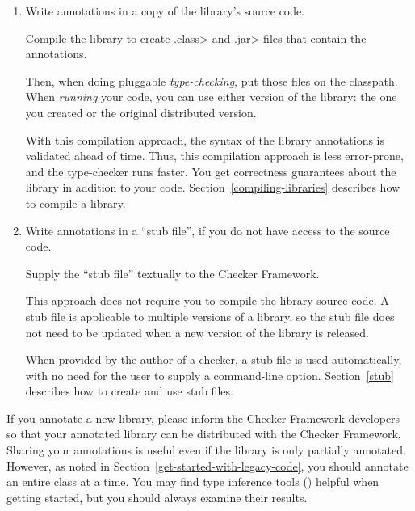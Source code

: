 \begin{enumerate}
\item
  Write annotations in a copy of the library's source code.

  Compile the library to create \<.class> and \<.jar> files that
  contain the annotations.

  Then, when doing pluggable \emph{type-checking},
  put those files on the classpath.
  When \emph{running} your code, you can use either version of the library:  the
  one you created or the original distributed version.


  With this compilation approach, the syntax of the library annotations is
  validated ahead of time.  Thus, this compilation approach is less
  error-prone, and the type-checker runs faster.  You get
  correctness guarantees about the library in addition to your code.
  Section~\ref{compiling-libraries} describes how to compile a library.

\item
  Write annotations in a ``stub file'', if you do not have access to the
  source code.

  Supply the ``stub file'' textually to the Checker Framework.

  This approach does not require you to compile the library source
  code.
  A stub file is applicable to multiple versions of a library, so
  the stub file does not need to be updated when a new version of the
  library is released.

  When provided by the author of a checker, a stub file is used
  automatically, with no need for the user to supply a command-line option.
  Section~\ref{stub} describes how to create and use stub files.

\end{enumerate}


If you annotate a new library, please inform the Checker Framework
developers so that your annotated library can be distributed with the
Checker Framework.
Sharing your annotations is useful even if the library is only partially
annotated.
However, as noted in Section~\ref{get-started-with-legacy-code}, you
should annotate an entire class at a time.
You may find type inference tools () helpful
when getting started, but you should always examine their results.


